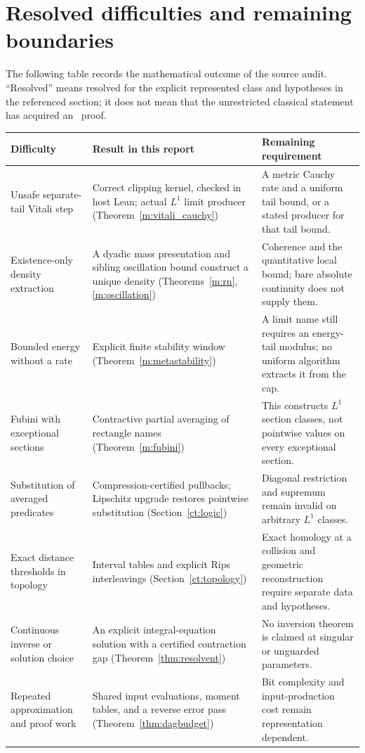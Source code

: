 \section{Resolved difficulties and remaining boundaries}
\label{sec:limits}

The following table records the mathematical outcome of the source
audit. ``Resolved'' means resolved for the explicit represented class
and hypotheses in the referenced section; it does not mean that the
unrestricted classical statement has acquired an \ipra\ proof.

\small
\begin{longtable}{>{\raggedright\arraybackslash}p{}>{\raggedright\arraybackslash}p{}>{\raggedright\arraybackslash}p{}}
\toprule
Difficulty & Result in this report & Remaining requirement \\
\midrule
\endhead
Unsafe separate-tail Vitali step & Correct clipping kernel, checked in
host Lean; actual \(L^1\) limit producer (Theorem~\ref{m:vitali_cauchy})
& A metric Cauchy rate and a uniform tail bound, or a stated producer for
that tail bound. \\
Existence-only density extraction & A dyadic mass presentation and
sibling oscillation bound construct a unique density
(Theorems~\ref{m:rn}, \ref{m:oscillation})
& Coherence and the quantitative local bound; bare absolute continuity
does not supply them. \\
Bounded energy without a rate & Explicit finite stability window
(Theorem~\ref{m:metastability})
& A limit name still requires an energy-tail modulus; no uniform
algorithm extracts it from the cap. \\
Fubini with exceptional sections & Contractive partial averaging of
rectangle names (Theorem~\ref{m:fubini})
& This constructs \(L^1\) section classes, not pointwise values on every
exceptional section. \\
Substitution of averaged predicates & Compression-certified pullbacks;
Lipschitz upgrade restores pointwise substitution
(Section~\ref{ct:logic})
& Diagonal restriction and supremum remain invalid on arbitrary
\(L^1\) classes. \\
Exact distance thresholds in topology & Interval tables and explicit
Rips interleavings (Section~\ref{ct:topology})
& Exact homology at a collision and geometric reconstruction require
separate data and hypotheses. \\
Continuous inverse or solution choice & An explicit integral-equation
solution with a certified contraction gap (Theorem~\ref{thm:resolvent})
& No inversion theorem is claimed at singular or unguarded parameters. \\
Repeated approximation and proof work & Shared input evaluations,
moment tables, and a reverse error pass (Theorem~\ref{thm:dagbudget})
& Bit complexity and input-production cost remain representation
dependent. \\
\bottomrule
\end{longtable}
\normalsize

